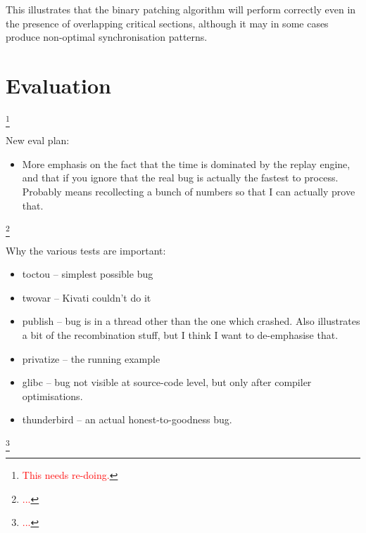 \documentclass[10pt,twocolumn,preprint,natbib,authoryear]{sigplanconf}
\newcommand{\editorial}[1]{\textcolor{red}{\footnote{\textcolor{red}{#1}}}}
\begin{document}
This illustrates that the binary patching algorithm will perform
correctly even in the presence of overlapping critical sections,
although it may in some cases produce non-optimal synchronisation
patterns.

\section{Evaluation}\editorial{This needs re-doing.}
\label{sect:evaluation}

New eval plan:

\begin{itemize}
\item More emphasis on the fact that the time is dominated by the
  replay engine, and that if you ignore that the real bug is actually
  the fastest to process.  Probably means recollecting a bunch of
  numbers so that I can actually prove that.
\end{itemize}\editorial{...}

Why the various tests are important:

\begin{itemize}
\item toctou -- simplest possible bug
\item twovar -- Kivati couldn't do it
\item publish -- bug is in a thread other than the one which crashed.
  Also illustrates a bit of the recombination stuff, but I think I
  want to de-emphasise that.
\item privatize -- the running example
\item glibc -- bug not visible at source-code level, but only after
  compiler optimisations.
\item thunderbird -- an actual honest-to-goodness bug.
\end{itemize}\editorial{...}
\end{document}
